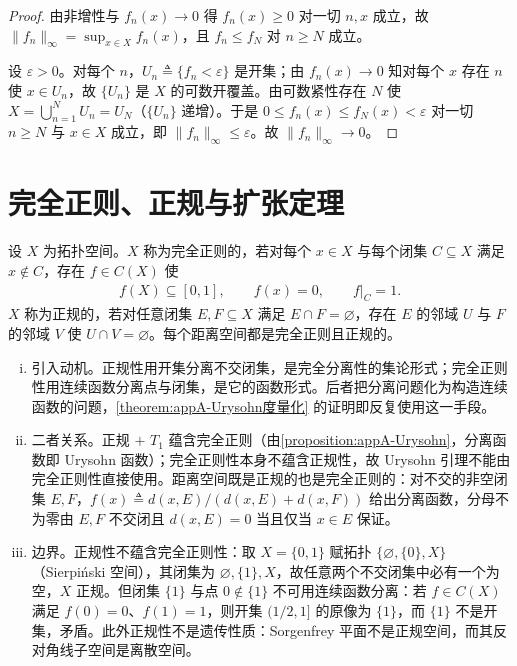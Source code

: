 \documentclass[../main.tex]{subfiles}
\begin{document}
\begin{proof}
由非增性与 $f_n(x)\to0$ 得 $f_n(x)\geqslant0$ 对一切 $n,x$ 成立，故 $\|f_n\|_\infty=\sup_{x\in X}f_n(x)$，且 $f_n\leqslant f_N$ 对 $n\geqslant N$ 成立。

设 $\varepsilon>0$。对每个 $n$，$U_n\triangleq\{f_n<\varepsilon\}$ 是开集；由 $f_n(x)\to0$ 知对每个 $x$ 存在 $n$ 使 $x\in U_n$，故 $\{U_n\}$ 是 $X$ 的可数开覆盖。由可数紧性存在 $N$ 使 $X=\bigcup_{n=1}^NU_n=U_N$（$\{U_n\}$ 递增）。于是 $0\leqslant f_n(x)\leqslant f_N(x)<\varepsilon$ 对一切 $n\geqslant N$ 与 $x\in X$ 成立，即 $\|f_n\|_\infty\leqslant\varepsilon$。故 $\|f_n\|_\infty\to0$。
\end{proof}

\section{完全正则、正规与扩张定理}\label{section:appA-正则正规}

\begin{definition}[完全正则与正规]\label{definition:appA-完全正则正规}
设 $X$ 为拓扑空间。$X$ 称为完全正则的，若对每个 $x\in X$ 与每个闭集 $C\subseteq X$ 满足 $x\notin C$，存在 $f\in C(X)$ 使
\begin{align*}
f(X)\subseteq[0,1],\qquad f(x)=0,\qquad f|_C=1.
\end{align*}
$X$ 称为正规的，若对任意闭集 $E,F\subseteq X$ 满足 $E\cap F=\varnothing$，存在 $E$ 的邻域 $U$ 与 $F$ 的邻域 $V$ 使 $U\cap V=\varnothing$。每个距离空间都是完全正则且正规的。
\end{definition}

\begin{remark}\label{remark:appA-完全正则正规}
\begin{enumerate}[(i)]
\item 引入动机。正规性用开集分离不交闭集，是完全分离性的集论形式；完全正则性用连续函数分离点与闭集，是它的函数形式。后者把分离问题化为构造连续函数的问题，\cref{theorem:appA-Urysohn度量化} 的证明即反复使用这一手段。
\item 二者关系。正规 $+$ $T_1$ 蕴含完全正则（由\cref{proposition:appA-Urysohn}，分离函数即 Urysohn 函数）；完全正则性本身不蕴含正规性，故 Urysohn 引理不能由完全正则性直接使用。距离空间既是正规的也是完全正则的：对不交的非空闭集 $E,F$，$f(x)\triangleq d(x,E)/(d(x,E)+d(x,F))$ 给出分离函数，分母不为零由 $E,F$ 不交闭且 $d(x,E)=0$ 当且仅当 $x\in E$ 保证。
\item 边界。正规性不蕴含完全正则性：取 $X=\{0,1\}$ 赋拓扑 $\{\varnothing,\{0\},X\}$（Sierpiński 空间），其闭集为 $\varnothing,\{1\},X$，故任意两个不交闭集中必有一个为空，$X$ 正规。但闭集 $\{1\}$ 与点 $0\notin\{1\}$ 不可用连续函数分离：若 $f\in C(X)$ 满足 $f(0)=0$、$f(1)=1$，则开集 $(1/2,1]$ 的原像为 $\{1\}$，而 $\{1\}$ 不是开集，矛盾。此外正规性不是遗传性质：Sorgenfrey 平面不是正规空间，而其反对角线子空间是离散空间。
\end{enumerate}
\end{remark}
\end{document}
